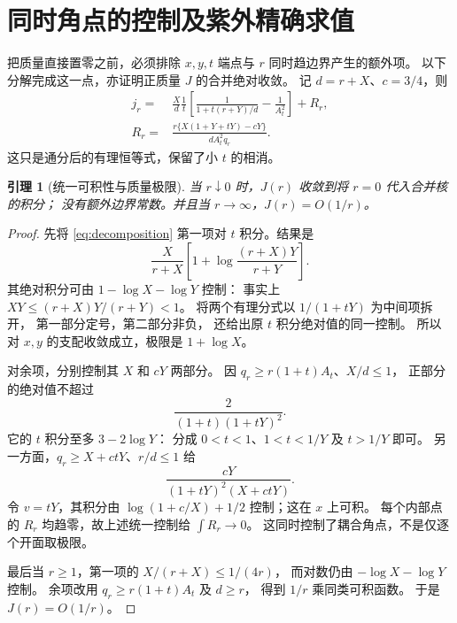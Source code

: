 \documentclass[11pt,a4paper]{ctexart}
\theoremstyle{cnplain}
\newtheorem{lemma}[theorem]{引理}
\theoremstyle{remark}\newtheorem{remark}[theorem]{注}
\begin{document}
\section{同时角点的控制及紫外精确求值}\label{sec:bounds}
把质量直接置零之前，必须排除 $x,y,t$ 端点与 $r$ 同时趋边界产生的额外项。
以下分解完成这一点，亦证明正质量 $J$ 的合并绝对收敛。
记 $d=r+X$、$c=3/4$，则
\begin{align}
 j_r={}&\frac{X}{d}\frac1t
 \left[\frac1{1+t(r+Y)/d}-\frac1{A_t^2}\right]
 +R_r,\label{eq:decomposition}\\
 R_r={}&\frac{r\{X(1+Y+tY)-cY\}}{d A_t^2q_r}.
                                                        \label{eq:R}
\end{align}
这只是通分后的有理恒等式，保留了小 $t$ 的相消。

\begin{lemma}[统一可积性与质量极限]\label{lem:domination}
当 $r\downarrow0$ 时，$J(r)$ 收敛到将 $r=0$ 代入合并核的积分；
没有额外边界常数。并且当 $r\to\infty$，$J(r)=O(1/r)$。
\end{lemma}
\begin{proof}
先将 \eqref{eq:decomposition} 第一项对 $t$ 积分。结果是
\begin{equation}\label{eq:main-integrated}
 \frac{X}{r+X}
       \left[1+\log\frac{(r+X)Y}{r+Y}\right].
\end{equation}
其绝对积分可由 $1-\log X-\log Y$ 控制：
事实上 $XY\leq(r+X)Y/(r+Y)<1$。
将两个有理分式以 $1/(1+tY)$ 为中间项拆开，
第一部分定号，第二部分非负，
还给出原 $t$ 积分绝对值的同一控制。
所以对 $x,y$ 的支配收敛成立，极限是 $1+\log X$。

对余项，分别控制其 $X$ 和 $cY$ 两部分。
因 $q_r\geq r(1+t)A_t$、$X/d\leq1$，
正部分的绝对值不超过
\begin{equation}\label{eq:Rplus-bound}
 \frac{2}{(1+t)(1+tY)^2}.
\end{equation}
它的 $t$ 积分至多 $3-2\log Y$：
分成 $0<t<1$、$1<t<1/Y$ 及 $t>1/Y$ 即可。
另一方面，$q_r\geq X+ctY$、$r/d\leq1$ 给
\begin{equation}\label{eq:Rminus-bound}
 \frac{cY}{(1+tY)^2(X+ctY)}.
\end{equation}
令 $v=tY$，其积分由
$\log(1+c/X)+1/2$ 控制；这在 $x$ 上可积。
每个内部点的 $R_r$ 均趋零，故上述统一控制给 $\int R_r\to0$。
这同时控制了耦合角点，不是仅逐个开面取极限。

最后当 $r\geq1$，第一项的 $X/(r+X)\leq1/(4r)$，
而对数仍由 $-\log X-\log Y$ 控制。
余项改用 $q_r\geq r(1+t)A_t$ 及 $d\geq r$，
得到 $1/r$ 乘同类可积函数。
于是 $J(r)=O(1/r)$。
\end{proof}
\end{document}
